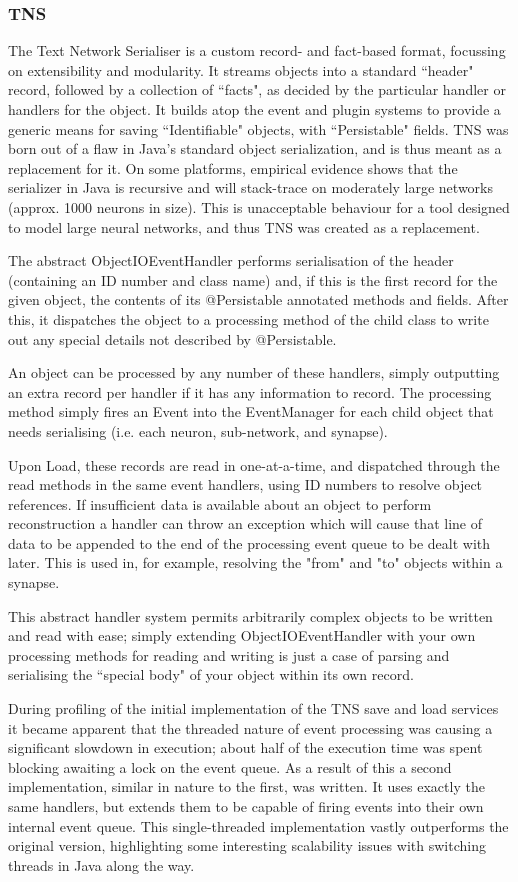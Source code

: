 \documentclass{acm_proc_article-sp}
\begin{document}
\subsubsection{TNS}
{
The Text Network Serialiser is a custom record{}- and fact{}-based format, focussing on extensibility and modularity. It streams objects into a standard ``header" record, followed by a collection of ``facts", as decided by the particular handler or handlers for the object. It builds atop the event and plugin systems to provide a generic means for saving ``Identifiable" objects, with ``Persistable" fields. TNS was born out of a flaw in Java's standard object serialization, and is thus meant as a replacement for it. On some platforms, empirical evidence shows that the serializer in Java is recursive and will stack{}-trace on moderately large networks (approx. 1000 neurons in size). This is unacceptable behaviour for a tool designed to model large neural networks, and thus TNS was created as a replacement.

The abstract ObjectIOEventHandler performs serialisation of the header (containing an ID number and class name) and, if this is the first record for the given object, the contents of its @Persistable annotated methods and fields. After this, it dispatches the object to a processing method of the child class to write out any special details not described by @Persistable. 

An object can be processed by any number of these handlers, simply outputting an extra record per handler if it has any information to record. The processing method simply fires an Event into the EventManager for each child object that needs serialising (i.e. each neuron, sub-network, and synapse).

Upon Load, these records are read in one-at-a-time, and dispatched through the read methods in the same event handlers, using ID numbers to resolve object references. If insufficient data is available about an object to perform reconstruction a handler can throw an exception which will cause that line of data to be appended to the end of the processing event queue to be dealt with later. This is used in, for example, resolving the "from" and "to" objects within a synapse.

This abstract handler system permits arbitrarily complex objects to be written and read with ease; simply extending ObjectIOEventHandler with your own processing methods for reading and writing is just a case of parsing and serialising the ``special body" of your object within its own record.

During profiling of the initial implementation of the TNS save and load services it became apparent that the threaded nature of event processing was causing a significant slowdown in execution; about half of the execution time was spent blocking awaiting a lock on the event queue. As a result of this a second implementation, similar in nature to the first, was written. It uses exactly the same handlers, but extends them to be capable of firing events into their own internal event queue. This single-threaded implementation vastly outperforms the original version, highlighting some interesting scalability issues with switching threads in Java along the way.
}
\end{document}
